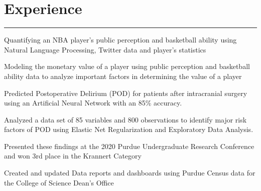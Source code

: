 \documentclass[]{sahana}
\begin{document}
\hfill
\begin{minipage}[t]{0.66\textwidth} 
\vspace{-1pt}
\section{Experience}
\noindent\rule{12.5cm}{0.4pt}
\vspace{-4pt}
\noindent
\begin{tightemize}
\item Quantifying an NBA player's public perception and basketball ability using Natural Language Processing, Twitter data and player's statistics
\item Modeling the monetary value of a player using public perception and basketball ability data to analyze important factors in determining the value of a player
\end{tightemize}
\sectionsep

\vspace{-4pt}
\noindent
\begin{tightemize}
\vspace{-5pt}
\item Predicted Postoperative Delirium (POD) for patients after intracranial surgery using an Artificial Neural Network with an 85\% accuracy.
\item Analyzed a data set of 85 variables and 800 observations to identify major risk factors of POD using Elastic Net Regularization and Exploratory Data Analysis.
\item Presented these findings at the 2020 Purdue Undergraduate Research Conference and won 3rd place in the Krannert Category
\end{tightemize}
\sectionsep

\vspace{-4pt}
\noindent
\begin{tightemize}
\vspace{-6pt}
\item Created and updated Data reports and dashboards using Purdue Census data for the College of Science Dean's Office
\end{tightemize}
\sectionsep


\end{minipage}
\end{document}
